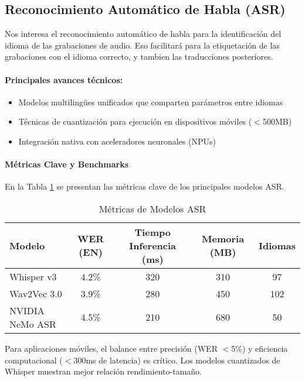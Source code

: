\subsection{Reconocimiento Automático de Habla (ASR)}
Nos interesa el reconocimiento automático de habla para la identificación del idioma de las grabaciones de audio. Eso facilitará para la etiquetación de las grabaciones con el idioma correcto, y tambien las traducciones posteriores.


\paragraph{Principales avances técnicos:}
\begin{itemize}
    \item Modelos multilingües unificados que comparten parámetros entre idiomas
    \item Técnicas de cuantización para ejecución en dispositivos móviles ($<$500MB)
    \item Integración nativa con aceleradores neuronales (NPUs)
\end{itemize}

\paragraph{Métricas Clave y Benchmarks}
En la Tabla \ref{tab:asr-metrics} se presentan las métricas clave de los principales modelos ASR.

\begin{table}[h]
    \centering
    \caption{Métricas de Modelos ASR}
    \label{tab:asr-metrics}
    \begin{tabular}{|l|c|c|c|c|}
        \hline
        \textbf{Modelo} & \textbf{WER (EN)} & \textbf{Tiempo Inferencia (ms)} & \textbf{Memoria (MB)} & \textbf{Idiomas} \\
        \hline
        Whisper v3 & 4.2\% & 320 & 310 & 97 \\
        \hline
        Wav2Vec 3.0 & 3.9\% & 280 & 450 & 102 \\
        \hline
        NVIDIA NeMo ASR & 4.5\% & 210 & 680 & 50 \\
        \hline
    \end{tabular}
\end{table}

Para aplicaciones móviles, el balance entre precisión (WER $<$5\%) y eficiencia computacional ($<$300ms de latencia) es crítico. Los modelos cuantizados de Whisper muestran mejor relación rendimiento-tamaño\cite{jia2022translatotron2highqualitydirect}.

